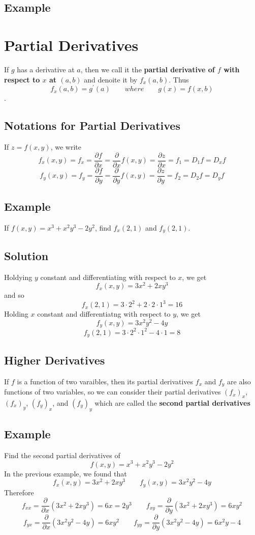 \subsection*{Example}

\section{Partial Derivatives}
If $g$ has a derivative at $a$, then we call it the \textbf{partial derivative of $f$ with respect to $x$ at $(a,b)$} and denoite it by $f_x(a,b)$. Thus
$$f_x(a,b) = g^\prime(a)\qquad where\qquad g(x) = f(x,b)$$.
\subsection*{Notations for Partial Derivatives}
If $z = f(x,y)$, we write $$f_x(x,y) = f_x = \frac{\partial f}{\partial x} = \frac{\partial}{\partial x}f(x,y) = \frac{\partial z}{\partial x} = f_1 = D_1f = D_xf$$
$$f_y(x,y) = f_y = \frac{\partial f}{\partial y} = \frac{\partial}{\partial y}f(x,y) = \frac{\partial z}{\partial y} = f_2 = D_2f = D_yf$$

\subsection*{Example}
If $f(x,y) = x^3 + x^2y^3 - 2y^2$, find $f_x(2,1)$ and $f_y(2,1)$. 
\subsection*{Solution}
Holdying $y$ constant and differentiating with respect to $x$, we get 
$$f_x(x,y) = 3x^2 + 2xy^3$$ and so $$f_x(2,1) = 3\cdot 2^2 + 2\cdot 2\cdot 1^3 = 16$$
Holding $x$ constant and differentiatng with respect to $y$, we get $$f_y(x,y) = 3x^2y^2 - 4y$$ $$f_y(2,1) = 3\cdot 2^2\cdot 1^2 - 4\cdot 1 = 8$$

\subsection*{Higher Derivatives}
If $f$ is a function of two varaibles, then its partial derivatives $f_x$ and $f_y$ are also functions of two variables, so we can consider their partial derivatives $(f_x)_x$, 
$(f_x)_y$, $(f_y)_x$, and $(f_y)_y$ which are called the \textbf{second partial derivatives}

\subsection*{Example}
Find the second partial derivatives of $$f(x,y) = x^3 + x^2y^3 - 2y^2$$
In the previous example, we found that $$f_x(x,y) = 3x^2 + 2xy^3\qquad f_y(x,y) = 3x^2y^2 - 4y$$
Therefore $$f_{xx} = \frac{\partial}{\partial x}(3x^2 + 2xy^3) = 6x = 2y^3\qquad f_{xy} = \frac{\partial}{\partial y}(3x^2 + 2xy^3) = 6xy^2$$
$$f_{yx} = \frac{\partial}{\partial x}(3x^2y^2 - 4y) = 6xy^2\qquad f_{yy} = \frac{\partial}{\partial y}(3x^2y^2 - 4y) = 6x^2y - 4$$

